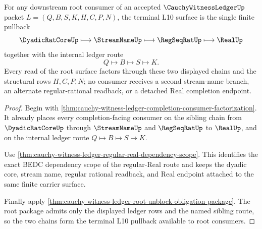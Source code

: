 \begin{theorem}
\label{thm:cauchy-witness-ledger-root-streamname-pullback}
For any downstream root consumer of an accepted $\CauchyWitnessLedgerUp$ packet $L=(Q,B,S,K,H,C,P,N)$, the terminal L10 surface is the single finite pullback
$$
\DyadicRatCoreUp \longmapsto \StreamNameUp \longmapsto \RegSeqRatUp \longmapsto \RealUp
$$
together with the internal ledger route
$$
Q \longmapsto B \longmapsto S \longmapsto K.
$$
Every read of the root surface factors through these two displayed chains and the structural rows $H,C,P,N$; no consumer receives a second stream-name branch, an alternate regular-rational readback, or a detached Real completion endpoint.
\end{theorem}
\begin{proof}
Begin with \autoref{thm:cauchy-witness-ledger-completion-consumer-factorization}. It already places every completion-facing consumer on the sibling chain from $\DyadicRatCoreUp$ through $\StreamNameUp$ and $\RegSeqRatUp$ to $\RealUp$, and on the internal ledger route $Q \longmapsto B \longmapsto S \longmapsto K$.

Use \autoref{thm:cauchy-witness-ledger-regular-real-dependency-scope}. This identifies the exact BEDC dependency scope of the regular-Real route and keeps the dyadic core, stream name, regular rational readback, and Real endpoint attached to the same finite carrier surface.

Finally apply \autoref{thm:cauchy-witness-ledger-root-unblock-obligation-package}. The root package admits only the displayed ledger rows and the named sibling route, so the two chains form the terminal L10 pullback available to root consumers.
\end{proof}

